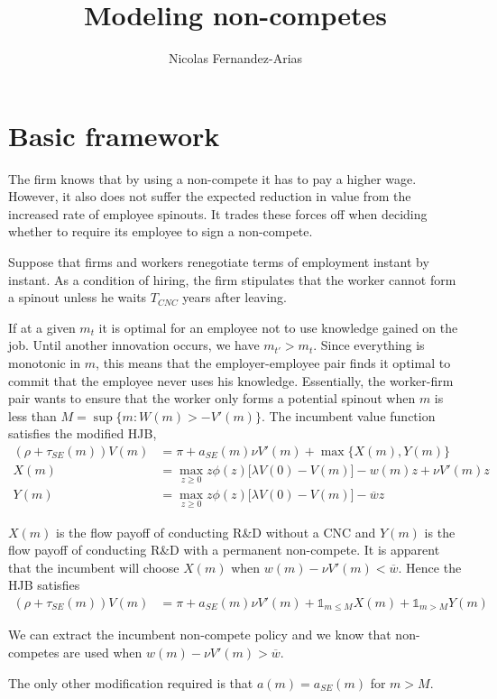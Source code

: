 \documentclass[12pt,english]{article}
\theoremstyle{remark}
\begin{document}
	
\title{Modeling non-competes}
\author{Nicolas Fernandez-Arias}
\maketitle


\section{Basic framework}

The firm knows that by using a non-compete it has to pay a higher wage. However, it also does not suffer the expected reduction in value from the increased rate of employee spinouts. It trades these forces off when deciding whether to require its employee to sign a non-compete.

Suppose that firms and workers renegotiate terms of employment instant by instant. As a condition of hiring, the firm stipulates that the worker cannot form a spinout unless he waits $T_{CNC}$ years after leaving. 

If at a given $m_t$ it is optimal for an employee not to use knowledge gained on the job. Until another innovation occurs, we have $m_{t'} > m_t$. Since everything is monotonic in $m$, this means that the employer-employee pair finds it optimal to commit that the employee never uses his knowledge. Essentially, the worker-firm pair wants to ensure that the worker only forms a potential spinout when $m$ is less than $M = \sup \{ m : W(m) > -V'(m) \}$. The incumbent value function satisfies the modified HJB, 
\begin{align}
	(\rho + \tau_{SE}(m)) V(m) &= \pi + a_{SE}(m) \nu V'(m) + \max \Big\{ X(m) , Y(m)   \Big\} \\
	X(m) &= \max_{z \ge 0} z\phi(z) \big[ \lambda V(0) - V(m) \big] - w(m)z + \nu V'(m) z \\
	Y(m) &= \max_{z \ge 0} z\phi(z) \big[ \lambda V(0) - V(m) \big] - \overline{w} z
\end{align}

$X(m)$ is the flow payoff of conducting R\&D without a CNC and $Y(m)$ is the flow payoff of conducting R\&D with a permanent non-compete. It is apparent that the incumbent will choose $X(m)$ when $w(m) - \nu V'(m) < \overline{w}$. Hence the HJB satisfies
\begin{align}
	(\rho + \tau_{SE}(m)) V(m) &= \pi + a_{SE}(m) \nu V'(m) + \mathbb{1}_{m \le M} X(m) + \mathbb{1}_{m > M} Y(m)   
\end{align} 

We can extract the incumbent non-compete policy and we know that non-competes are used when $w(m) - \nu V'(m) > \overline{w}$.

The only other modification required is that $a(m) = a_{SE}(m)$ for $m > M$. 
\end{document}
